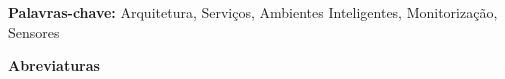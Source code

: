 \documentclass[a4paper, 12pt, oneside]{Thesis}  %
\begin{document}
\vspace{3cm}

\textbf{Palavras-chave:} Arquitetura, Serviços, Ambientes Inteligentes, Monitorização, Sensores




\newpage
\thispagestyle{empty}
\mbox{}


\newpage
\thispagestyle{empty}
\mbox{}



\pagestyle{fancy}  %

\tableofcontents  %

\renewcommand\listfigurename{Lista de Figuras}
\listoffigures  %

\renewcommand\listtablename{Lista de Tabelas}
\listoftables  %
\newpage

\newpage
\thispagestyle{empty}
\mbox{}
\clearpage  %

{\centering \LARGE
{\LARGE\bf \textbf{Abreviaturas} } }\\\\
\end{document}
